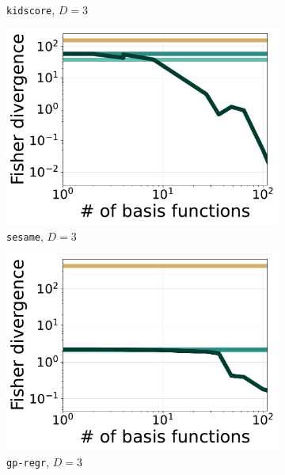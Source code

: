 \begin{figure}[t]
\begin{subfigure}[b]{0.245\linewidth}
    \caption{\texttt{kidscore}, $D=3$}
    \end{subfigure}
    \begin{subfigure}[b]{0.245\linewidth}
        \centering
        \includegraphics[scale=0.21]{figs/expts-pdb/PDB_97_scores_noflow.pdf}
    \caption{\texttt{sesame}, $D=3$}
    \end{subfigure}
    \begin{subfigure}[b]{0.245\linewidth}
        \centering
        \includegraphics[scale=0.21]{figs/expts-pdb/PDB_64_scores_noflow.pdf}
        \caption{\texttt{gp-regr}, $D=3$
            }
    \end{subfigure}
    \begin{subfigure}[b]{0.245\linewidth}
        \centering

\end{subfigure}
\end{figure}
